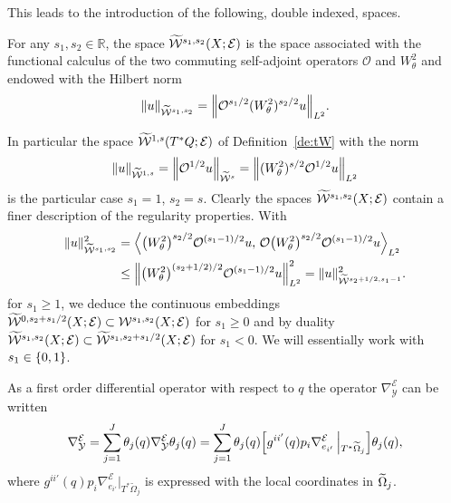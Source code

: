 \documentclass[AHL,Unicode,longabstracts]{cedram}
\newcommand{\R}{\mathbb{R}}
\newcommand{\clW}{\mathcal{W}}
\newcommand{\clY}{\mathcal{Y}}
\newcommand{\clO}{\mathcal{O}}
\newcommand{\clE}{\mathcal{E}}
\let\oldtilde\tilde
\renewcommand*{\tilde}[1]{\mathchoice{\widetilde{#1}}{\widetilde{#1}}{\oldtilde{#1}}{\oldtilde{#1}}}
\let\originalleft\left
\let\originalright\right
\renewcommand{\left}{\mathopen{}\mathclose\bgroup\originalleft}
\renewcommand{\right}{\aftergroup\egroup\originalright}
\begin{document}
This leads to the introduction of the following, double indexed, spaces.

\begin{defi}\label{de:Ws1s2}
For any $s_{1},s_{2}\in \R$, the space $\tilde{\clW}^{s_{1},s_{2}}(X;\clE)$ is the space associated with the functional calculus of the two commuting self-adjoint operators $\clO$ and $W^{2}_{\theta}$ and endowed with the Hilbert norm
\[
\|u\|_{\widetilde{\clW}^{s_{1},s_{2}}}=
\left\|\clO^{s_{1}/2}(W^{2}_{\theta})^{s_{2}/2}u\right\|_{L^{2}}.
\]
\end{defi}

In particular the space $\tilde{\clW}^{1,s}(T^{*}Q;\clE)$ of Definition~\ref{de:tW} with the norm
\[
\|u\|_{\widetilde{\clW}^{1,s}}=\left\|\clO^{1/2}u\right\|_{\widetilde{\clW}^{s}}=\left\|(W^{2}_{\theta})^{s/2}\clO^{1/2}u\right\|_{L^{2}}
\]
is the particular case $s_{1}=1$, $s_{2}=s$. Clearly the spaces $\tilde{\clW}^{s_{1},s_{2}}(X;\clE)$ contain a finer description of the regularity properties. With
\begin{align*}
\|u\|_{\widetilde{\clW}^{s_{1},s_{2}}}^{2} &=\left\langle \left(W^{2}_{\theta}\right)^{s_{2}/2}\clO^{(s_{1}-1)/2}u,\, \clO\left(W^{2}_{\theta}\right)^{s_{2}/2}\clO^{(s_{1}-1)/2}u\right\rangle_{L^{2}}\\
&\leq \left\|\left(W^{2}_{\theta}\right)^{(s_{2}+1/2)/2}\clO^{(s_{1}-1)/2}u\right\|_{L^{2}}^{2}=\|u\|_{\widetilde{\clW}^{s_{2}+1/2,s_{1}-1}}^{2}.
\end{align*}
for $s_{1}\geq 1$, we deduce the continuous embeddings $\tilde{\clW}^{0,s_{2}+s_{1}/2}(X;\clE)\subset \clW^{s_{1},s_{2}}(X;\clE)$ for $s_{1}\geq 0$ and by duality $\tilde{\clW}^{s_{1},s_{2}}(X;\clE)\subset \tilde{\clW}^{s_{1},s_{2}+s_{1}/2}(X;\clE)$ for $s_{1}<0$. We will essentially work with $s_{1}\in \left\{0,1\right\}$.

As a first order differential operator with respect to $q$ the operator $\nabla_{\clY}^{\clE}$ can be written
\[
\nabla_{\clY}^{\clE}=\sum_{j=1}^{J}\theta_{j}(q)\nabla_{\clY}^{\clE}\theta_{j}(q)=\sum_{j=1}^{J}\theta_{j}(q)\left[g^{ii'}(q)p_{i}\nabla_{e_{i'}}^{\clE}\,\middle|_{T^{*}\widetilde{\Omega}_{j}}\right]\theta_{j}(q),
\]
where $g^{ii'}(q)p_{i}\nabla_{e_{i'}}^{\clE}|_{T^{*}\widetilde{\Omega}_{j}}$ is expressed with the local coordinates in $\tilde{\Omega}_{j}$.
\end{document}
